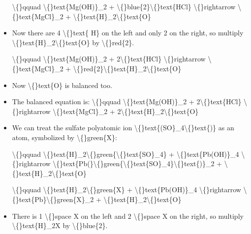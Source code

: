 \documentclass{article}
\begin{document}
\begin{itemize}
                    \textbackslash\{\}qquad
                        \textbackslash\{\}text\{Mg(OH)\}\_2 + \textbackslash\{\}blue\{2\}\textbackslash\{\}text\{HCl\} \textbackslash\{\}rightarrow \textbackslash\{\}text\{MgCl\}\_2 + \textbackslash\{\}text\{H\}\_2\textbackslash\{\}text\{O\}
  \item Now there are 4 \textbackslash\{\}text\{ H\} on the left and
                        only 2 on the right, so multiply
                        \textbackslash\{\}text\{H\}\_2\textbackslash\{\}text\{O\} by \textbackslash\{\}red\{2\}.
                    
                    \textbackslash\{\}qquad
                        \textbackslash\{\}text\{Mg(OH)\}\_2 + 2\textbackslash\{\}text\{HCl\} \textbackslash\{\}rightarrow \textbackslash\{\}text\{MgCl\}\_2 + \textbackslash\{\}red\{2\}\textbackslash\{\}text\{H\}\_2\textbackslash\{\}text\{O\}
  \item Now \textbackslash\{\}text\{O\} is balanced too.
  \item The balanced equation is:
                    \textbackslash\{\}qquad
                        \textbackslash\{\}text\{Mg(OH)\}\_2 + 2\textbackslash\{\}text\{HCl\} \textbackslash\{\}rightarrow \textbackslash\{\}text\{MgCl\}\_2 + 2\textbackslash\{\}text\{H\}\_2\textbackslash\{\}text\{O\}
  \item We can treat the sulfate polyatomic ion \textbackslash\{\}text\{(SO\}\_4\textbackslash\{\}text\{)\} as an atom, symbolized by \textbackslash\{\}green\{X\}:
                    
                    \textbackslash\{\}qquad
                        \textbackslash\{\}text\{H\}\_2\textbackslash\{\}green\{\textbackslash\{\}text\{SO\}\_4\} + \textbackslash\{\}text\{Pb(OH)\}\_4 \textbackslash\{\}rightarrow \textbackslash\{\}text\{Pb(\}\textbackslash\{\}green\{\textbackslash\{\}text\{SO\}\_4\}\textbackslash\{\}text\{)\}\_2 + \textbackslash\{\}text\{H\}\_2\textbackslash\{\}text\{O\}
                    
                    \textbackslash\{\}qquad
                        \textbackslash\{\}text\{H\}\_2\textbackslash\{\}green\{X\} + \textbackslash\{\}text\{Pb(OH)\}\_4 \textbackslash\{\}rightarrow \textbackslash\{\}text\{Pb\}\textbackslash\{\}green\{X\}\_2 + \textbackslash\{\}text\{H\}\_2\textbackslash\{\}text\{O\}
  \item There is 1 \textbackslash\{\}space X on the left and 2 \textbackslash\{\}space X
                        on the right, so multiply
                        \textbackslash\{\}text\{H\}\_2X by \textbackslash\{\}blue\{2\}.
                    

\end{itemize}
\end{document}
